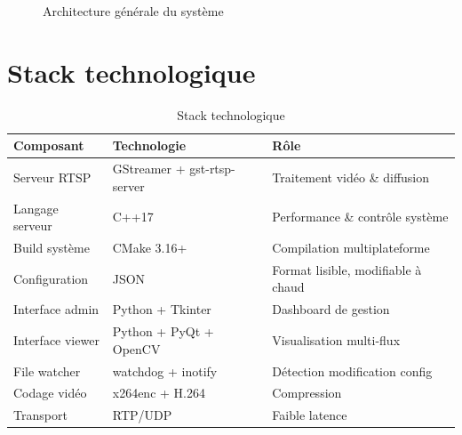 \documentclass[12pt,a4paper]{report}
\begin{document}
\begin{figure}[H]
    \centering
    \caption{Architecture générale du système}
    \label{fig:archi}
\end{figure}

\section{Stack technologique}

\begin{table}[H]
    \centering
    \caption{Stack technologique}
    \label{tab:stack}
    \begin{tabular}{|l|l|l|}
        \hline
        \textbf{Composant} & \textbf{Technologie} & \textbf{Rôle} \\
        \hline
        Serveur RTSP & GStreamer + gst-rtsp-server & Traitement vidéo \& diffusion \\
        Langage serveur & C++17 & Performance \& contrôle système \\
        Build système & CMake 3.16+ & Compilation multiplateforme \\
        Configuration & JSON & Format lisible, modifiable à chaud \\
        Interface admin & Python + Tkinter & Dashboard de gestion \\
        Interface viewer & Python + PyQt + OpenCV & Visualisation multi-flux \\
        File watcher & watchdog + inotify & Détection modification config \\
        Codage vidéo & x264enc + H.264 & Compression \\
        Transport & RTP/UDP & Faible latence \\
        \hline
    \end{tabular}
\end{table}
\end{document}
